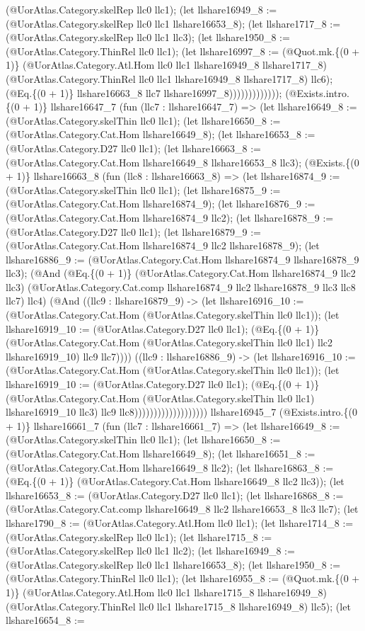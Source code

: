\documentclass[11pt]{article}
\begin{document}
(@UorAtlas.Category.skelRep llc0 llc1); (let llshare16949\_8 := (@UorAtlas.Category.skelRep llc0 llc1 llshare16653\_8); (let llshare1717\_8 := (@UorAtlas.Category.skelRep llc0 llc1 llc3); (let llshare1950\_8 := (@UorAtlas.Category.ThinRel llc0 llc1); (let llshare16997\_8 := (@Quot.mk.\{(0 + 1)\} (@UorAtlas.Category.Atl.Hom llc0 llc1 llshare16949\_8 llshare1717\_8) (@UorAtlas.Category.ThinRel llc0 llc1 llshare16949\_8 llshare1717\_8) llc6); (@Eq.\{(0 + 1)\} llshare16663\_8 llc7 llshare16997\_8))))))))))))); (@Exists.intro.\{(0 + 1)\} llshare16647\_7 (fun (llc7 : llshare16647\_7) => (let llshare16649\_8 := (@UorAtlas.Category.skelThin llc0 llc1); (let llshare16650\_8 := (@UorAtlas.Category.Cat.Hom llshare16649\_8); (let llshare16653\_8 := (@UorAtlas.Category.D27 llc0 llc1); (let llshare16663\_8 := (@UorAtlas.Category.Cat.Hom llshare16649\_8 llshare16653\_8 llc3); (@Exists.\{(0 + 1)\} llshare16663\_8 (fun (llc8 : llshare16663\_8) => (let llshare16874\_9 := (@UorAtlas.Category.skelThin llc0 llc1); (let llshare16875\_9 := (@UorAtlas.Category.Cat.Hom llshare16874\_9); (let llshare16876\_9 := (@UorAtlas.Category.Cat.Hom llshare16874\_9 llc2); (let llshare16878\_9 := (@UorAtlas.Category.D27 llc0 llc1); (let llshare16879\_9 := (@UorAtlas.Category.Cat.Hom llshare16874\_9 llc2 llshare16878\_9); (let llshare16886\_9 := (@UorAtlas.Category.Cat.Hom llshare16874\_9 llshare16878\_9 llc3); (@And (@Eq.\{(0 + 1)\} (@UorAtlas.Category.Cat.Hom llshare16874\_9 llc2 llc3) (@UorAtlas.Category.Cat.comp llshare16874\_9 llc2 llshare16878\_9 llc3 llc8 llc7) llc4) (@And ((llc9 : llshare16879\_9) -> (let llshare16916\_10 := (@UorAtlas.Category.Cat.Hom (@UorAtlas.Category.skelThin llc0 llc1)); (let llshare16919\_10 := (@UorAtlas.Category.D27 llc0 llc1); (@Eq.\{(0 + 1)\} (@UorAtlas.Category.Cat.Hom (@UorAtlas.Category.skelThin llc0 llc1) llc2 llshare16919\_10) llc9 llc7)))) ((llc9 : llshare16886\_9) -> (let llshare16916\_10 := (@UorAtlas.Category.Cat.Hom (@UorAtlas.Category.skelThin llc0 llc1)); (let llshare16919\_10 := (@UorAtlas.Category.D27 llc0 llc1); (@Eq.\{(0 + 1)\} (@UorAtlas.Category.Cat.Hom (@UorAtlas.Category.skelThin llc0 llc1) llshare16919\_10 llc3) llc9 llc8))))))))))))))))))) llshare16945\_7 (@Exists.intro.\{(0 + 1)\} llshare16661\_7 (fun (llc7 : llshare16661\_7) => (let llshare16649\_8 := (@UorAtlas.Category.skelThin llc0 llc1); (let llshare16650\_8 := (@UorAtlas.Category.Cat.Hom llshare16649\_8); (let llshare16651\_8 := (@UorAtlas.Category.Cat.Hom llshare16649\_8 llc2); (let llshare16863\_8 := (@Eq.\{(0 + 1)\} (@UorAtlas.Category.Cat.Hom llshare16649\_8 llc2 llc3)); (let llshare16653\_8 := (@UorAtlas.Category.D27 llc0 llc1); (let llshare16868\_8 := (@UorAtlas.Category.Cat.comp llshare16649\_8 llc2 llshare16653\_8 llc3 llc7); (let llshare1790\_8 := (@UorAtlas.Category.Atl.Hom llc0 llc1); (let llshare1714\_8 := (@UorAtlas.Category.skelRep llc0 llc1); (let llshare1715\_8 := (@UorAtlas.Category.skelRep llc0 llc1 llc2); (let llshare16949\_8 := (@UorAtlas.Category.skelRep llc0 llc1 llshare16653\_8); (let llshare1950\_8 := (@UorAtlas.Category.ThinRel llc0 llc1); (let llshare16955\_8 := (@Quot.mk.\{(0 + 1)\} (@UorAtlas.Category.Atl.Hom llc0 llc1 llshare1715\_8 llshare16949\_8) (@UorAtlas.Category.ThinRel llc0 llc1 llshare1715\_8 llshare16949\_8) llc5); (let llshare16654\_8 := 
\end{document}
